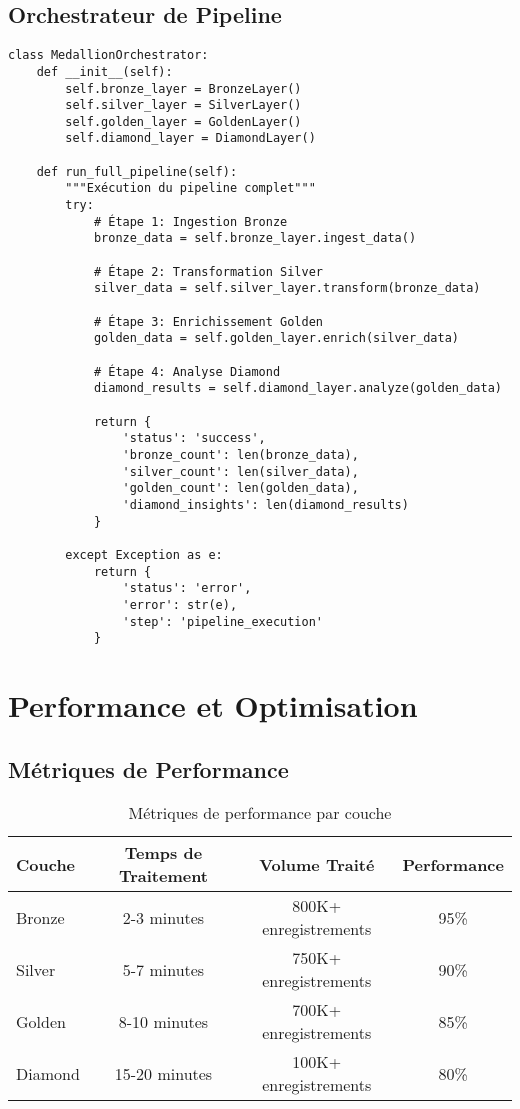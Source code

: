 \subsection{Orchestrateur de Pipeline}

\begin{verbatim}
class MedallionOrchestrator:
    def __init__(self):
        self.bronze_layer = BronzeLayer()
        self.silver_layer = SilverLayer()
        self.golden_layer = GoldenLayer()
        self.diamond_layer = DiamondLayer()
    
    def run_full_pipeline(self):
        """Exécution du pipeline complet"""
        try:
            # Étape 1: Ingestion Bronze
            bronze_data = self.bronze_layer.ingest_data()
            
            # Étape 2: Transformation Silver
            silver_data = self.silver_layer.transform(bronze_data)
            
            # Étape 3: Enrichissement Golden
            golden_data = self.golden_layer.enrich(silver_data)
            
            # Étape 4: Analyse Diamond
            diamond_results = self.diamond_layer.analyze(golden_data)
            
            return {
                'status': 'success',
                'bronze_count': len(bronze_data),
                'silver_count': len(silver_data),
                'golden_count': len(golden_data),
                'diamond_insights': len(diamond_results)
            }
            
        except Exception as e:
            return {
                'status': 'error',
                'error': str(e),
                'step': 'pipeline_execution'
            }
\end{verbatim}

\section{Performance et Optimisation}

\subsection{Métriques de Performance}

\begin{table}[H]
\centering
\begin{tabular}{|L|C|C|C|}
\hline
\textbf{Couche} & \textbf{Temps de Traitement} & \textbf{Volume Traité} & \textbf{Performance} \\
\hline
Bronze & 2-3 minutes & 800K+ enregistrements & 95\% \\
\hline
Silver & 5-7 minutes & 750K+ enregistrements & 90\% \\
\hline
Golden & 8-10 minutes & 700K+ enregistrements & 85\% \\
\hline
Diamond & 15-20 minutes & 100K+ enregistrements & 80\% \\
\hline
\end{tabular}
\caption{Métriques de performance par couche}
\label{tab:performance_metrics}
\end{table}

